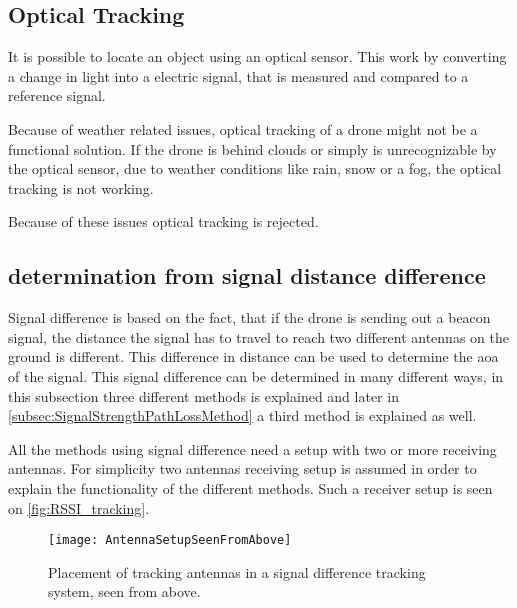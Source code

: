 \subsection{Optical Tracking}
It is possible to locate an object using an optical sensor. This work by converting a change in light into a electric signal, that is measured and compared to a reference signal. 

Because of weather related issues, optical tracking of a drone might not be a functional solution. If the drone is behind clouds or simply is unrecognizable by the optical sensor, due to weather conditions like rain, snow or a fog, the optical tracking is not working. 

Because of these issues optical tracking is rejected. 

\subsection{ determination from signal distance difference}\label{sec:detSignalDistanceDifference}
Signal difference is based on the fact, that if the drone is sending out a beacon signal, the distance the signal has to travel to reach two  different antennas on the ground is different. This difference in distance can be used to determine the \gls{aoa} of the signal. This signal difference can be determined in many different ways, in this subsection three different methods is explained and later in \autoref{subsec:SignalStrengthPathLossMethod} a third method is explained as well. 

All the methods using signal difference need a setup with two or more receiving antennas. For simplicity two antennas receiving setup is assumed in order to explain the functionality of the different methods. Such a receiver setup is seen on \autoref{fig:RSSI_tracking}. 
\begin{figure}[h]
	\centering
	\texttt{[image: AntennaSetupSeenFromAbove]}
	\caption{Placement of tracking antennas in a signal difference tracking system, seen from above.}
	\label{fig:RSSI_tracking}
\end{figure}

